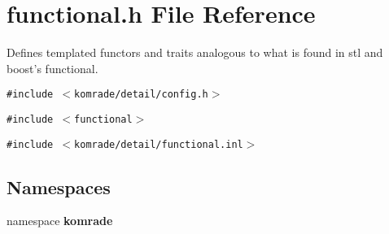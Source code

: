 \section{functional.h File Reference}
\label{functional_8h}
Defines templated functors and traits analogous to what is found in stl and boost's functional. 

{\tt \#include $<$komrade/detail/config.h$>$}\par
{\tt \#include $<$functional$>$}\par
{\tt \#include $<$komrade/detail/functional.inl$>$}\par
\subsection*{Namespaces}
\begin{CompactItemize}
\item 
namespace {\bf komrade}
\end{CompactItemize}
